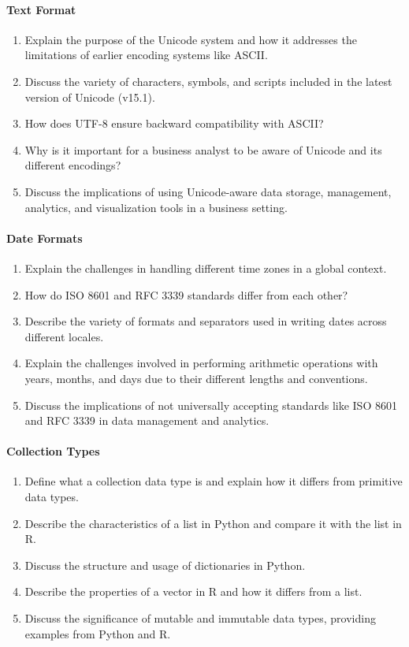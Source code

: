 \paragraph*{Text Format}
\begin{enumerate}
    \item Explain the purpose of the Unicode system and how it addresses the limitations of earlier encoding systems like ASCII.
    \item Discuss the variety of characters, symbols, and scripts included in the latest version of Unicode (v15.1).
    \item How does UTF-8 ensure backward compatibility with ASCII?
    \item Why is it important for a business analyst to be aware of Unicode and its different encodings?
    \item Discuss the implications of using Unicode-aware data storage, management, analytics, and visualization tools in a business setting.
\end{enumerate}
\paragraph*{Date Formats}
\begin{enumerate}
    \item Explain the challenges in handling different time zones in a global context.
    \item How do ISO 8601 and RFC 3339 standards differ from each other?
    \item Describe the variety of formats and separators used in writing dates across different locales.
    \item Explain the challenges involved in performing arithmetic operations with years, months, and days due to their different lengths and conventions.
    \item Discuss the implications of not universally accepting standards like ISO 8601 and RFC 3339 in data management and analytics.
\end{enumerate}
\paragraph*{Collection Types}
\begin{enumerate}
    \item Define what a collection data type is and explain how it differs from primitive data types.
    \item Describe the characteristics of a list in Python and compare it with the list in R.
    \item Discuss the structure and usage of dictionaries in Python. 
    \item Describe the properties of a vector in R and how it differs from a list.
    \item Discuss the significance of mutable and immutable data types, providing examples from Python and R.
\end{enumerate}
